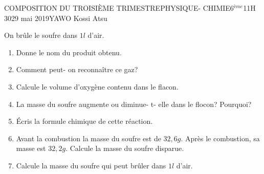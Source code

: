 \documentclass[12pt,a4paper]{book}
\newcommand{\prof}{YAWO Kossi Atsu}
\newcommand{\matiere}{PHYSIQUE- CHIMIE}
\newcommand{\classe}{6$^{ème}$}
\begin{document}
\begin{devoir}{COMPOSITION DU TROISIÈME TRIMESTRE}{\matiere}{\classe}{1}{1H 30}{29 mai 2019}{\prof}
\begin{exo}[4]
\vspace{0.2cm}
\end{exo}

\begin{exo}[7]
On brûle le soufre dans $1l$ d'air.
\begin{enumerate}
\item Donne le nom du produit obtenu.
\item Comment peut- on reconnaître ce gaz?
\item Calcule le volume d'oxygène contenu dans le flacon.
\item La masse du soufre augmente ou diminue- t- elle dans le flocon? Pourquoi?
\item Écris la formule chimique de cette réaction.
\item Avant la combustion la masse du soufre est de $32,6g$. Après le combustion, sa masse est $32,2g$. Calcule la masse du soufre disparue.
\item Calcule la masse du soufre qui peut brûler dans $1l$ d'air.
\end{enumerate}

\vspace{0.2cm}
\end{exo}


\end{devoir}
\end{document}
